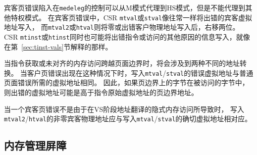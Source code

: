 宾客页错误陷入在{\tt medeleg}的控制可以从M模式代理到HS模式，但是不能代理到其他特权模式。
在宾客页错误中，CSR {\tt mtval}或{\tt stval}像往常一样将出错的宾客虚拟地址写入，
而{\tt mtval2}或{\tt htval}则将零或出错客户物理地址写入后，右移两位。
CSR {\tt mtinst}或{\tt htinst}同时也可能将出错指令或访问的其他原因的信息写入，就像在第~\ref{sec:tinst-vals}节解释的那样。

当指令获取或未对齐的内存访问跨越页面边界时，将会涉及到两种不同的地址转换。
当客户页错误出现在这种情况下时，写入{\tt mtval}/{\tt stval}的错误虚拟地址与普通页面错误所需的虚拟地址相同。
因此，如果页边界上的字节在被访问的字节中，则出错的虚拟地址可能是高于指令原始虚拟地址的页边界地址。

当一个宾客页错误不是由于在VS阶段地址翻译的隐式内存访问所导致时，
写入{\tt mtval2}/{\tt htval}的非零宾客物理地址应与写入{\tt mtval}/{\tt stval}的确切虚拟地址相对应。

\subsection{内存管理屏障}

